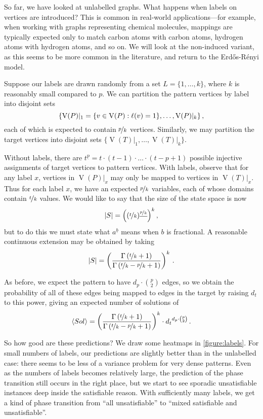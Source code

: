 \documentclass[twoside,11pt]{article}
\begin{document}
So far, we have looked at unlabelled graphs. What happens when labels on vertices are introduced?
This is common in real-world applications---for example, when working with graphs representing
chemical molecules, mappings are typically expected only to match carbon atoms with carbon atoms,
hydrogen atoms with hydrogen atoms, and so on.  We will look at the non-induced variant, as this
seems to be more common in the literature, and return to the Erd\H{o}s-R\'enyi model.

Suppose our labels are drawn randomly from a set $L = \{ 1, \ldots, k \}$, where $k$ is reasonably
small compared to $p$. We can partition the pattern vertices by label into disjoint sets \[\{
    \operatorname{V}(P)\vert_1 = \{ v \in \operatorname{V}(P) : \ell(v) = 1 \}, \ldots,
    \operatorname{V}(P)\vert_k \}\textnormal{\,,}\] each of which is expected to contain
$\nicefrac{p}{k}$ vertices. Similarly, we may partition the target vertices into disjoint sets $\{
    \operatorname{V}(T)\vert_1, \ldots, \operatorname{V}(T)\vert_k \}$.

Without labels, there are $t^{\underline{p}} = t \cdot (t - 1) \cdot \ldots \cdot (t - p + 1)$
possible injective assignments of target vertices to pattern vertices.  With labels, observe that
for any label $x$, vertices in $\operatorname{V}(P)|_x$ may only be mapped to vertices in
$\operatorname{V}(T)|_x$.  Thus for each label $x$, we have an expected $\nicefrac{p}{k}$ variables,
each of whose domains contain $\nicefrac{t}{k}$ values. We would like to say that the size of the
state space is now \[ |S| = \left((\nicefrac{t}{k})^{\underline{\nicefrac{p}{k}}}\right)^{k}
\textnormal{,} \] but to do this we must state what $a^{\underline{b}}$ means when $b$ is fractional.
A reasonable continuous extension may be obtained by taking \[ |S| = \left(\frac{\Gamma\left(\nicefrac{t}{k}
+ 1\right)}{\Gamma\left(\nicefrac{t}{k} - \nicefrac{p}{k} + 1\right)}\right)^{k} \textnormal{\,.} \]

As before, we expect the pattern to have $d_p \cdot \binom{p}{2}$ edges, so we obtain the
probability of all of these edges being mapped to edges in the target by raising $d_t$ to this
power, giving an expected number of solutions of \[ \langle Sol \rangle = \left(
    \frac{\Gamma\left(\nicefrac{t}{k} + 1\right)}{\Gamma\left(\nicefrac{t}{k} - \nicefrac{p}{k} +
1\right)} \right)^{k}  \cdot
{d_t}^{d_p \cdot \binom{p}{2}} \textnormal{\,.} \]

So how good are these predictions? We draw some heatmaps in \cref{figure:labels}. For small numbers
of labels, our predictions are slightly better than in the unlabelled case: there seems to be less
of a variance problem for very dense patterns. Even as the numbers of labels becomes relatively
large, the prediction of the phase transition still occurs in the right place, but we start to see
sporadic unsatisfiable instances deep inside the satisfiable reason. With sufficiently many labels,
we get a kind of phase transition from ``all unsatisfiable'' to ``mixed satisfiable and
unsatisfiable''.
\end{document}
